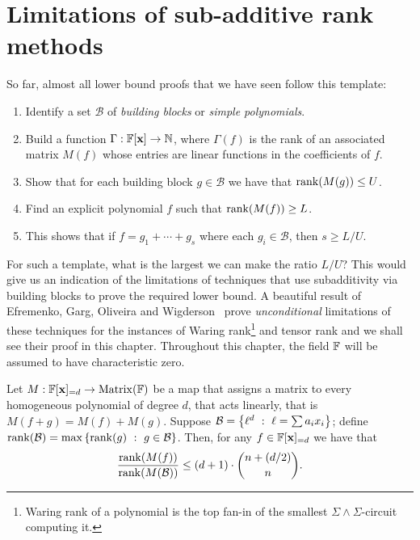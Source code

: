 \chapter{Limitations of sub-additive rank methods}\label{chap:subadditive-rank-barrier}

So far, almost all lower bound proofs that we have seen follow this template:

\begin{enumerate}
\item Identify a set $\mathcal{B}$ of \emph{building blocks} or \emph{simple polynomials}.
\item Build a function $\Gamma: \mathbb{F}[\mathbf{x}] \rightarrow \mathbb{N}$, where $\Gamma(f)$ is the rank of an associated matrix $M(f)$ whose entries are linear functions in the coefficients of $f$.
\item Show that for each building block $g \in \mathcal{B}$ we have that $\operatorname{rank}(M(g)) \leq U$.
\item Find an explicit polynomial $f$ such that $\operatorname{rank}(M(f)) \geq L$.
\item This shows that if $f = g_1 + \cdots + g_s$ where each $g_i \in \mathcal{B}$, then $s \geq L/U$. 
\end{enumerate}

\noindent
For such a template, what is the largest we can make the ratio $L/U$? This would give us an indication of the limitations of techniques that use subadditivity via building blocks to prove the required lower bound. A beautiful result of Efremenko, Garg, Oliveira and Wigderson~\cite{EGOW18} prove \emph{unconditional} limitations of these techniques for the instances of Waring rank\footnote{Waring rank of a polynomial is the top fan-in of the smallest $\Sigma\!\wedge\!\Sigma$-circuit computing it.} and tensor rank and we shall see their proof in this chapter. Throughout this chapter, the field $\mathbb{F}$ will be assumed to have characteristic zero.
\begin{theorem}\label{thm:limitations-waring-rank}
  Let $M: \mathbb{F}[\mathbf{x}]_{= d} \rightarrow \operatorname{Matrix}(\mathbb{F})$ be a map that assigns a matrix to every homogeneous polynomial of degree  $d$,  that acts linearly, that is $M(f + g) = M(f) + M(g)$. Suppose $\mathcal{B} = \left\{{\ell^d}\ : \ {\ell = \sum a_i x_i}\right\}$; define $\operatorname{rank}(\mathcal{B}) = \max\left\{{\operatorname{rank}(g)}\ : \ {g\in \mathcal{B}}\right\}$. Then, for any $f \in \mathbb{F}[\mathbf{x}]_{=d}$ we have that
  \[
    \frac{\operatorname{rank}(M(f))}{\operatorname{rank}(M(\mathcal{B}))} \leq (d+1) \cdot \binom{n+(d/2)}{n}. 
  \]
\end{theorem}

